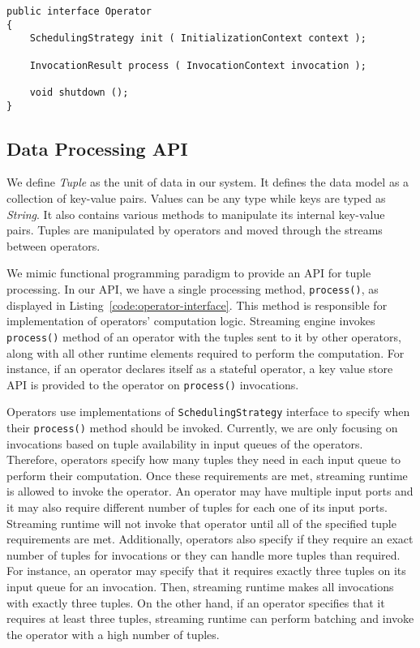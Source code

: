 \lstset{language=JAVA, caption="Operator Interface"}
\begin{lstlisting}[frame=single] 
public interface Operator
{
    SchedulingStrategy init ( InitializationContext context );
	
    InvocationResult process ( InvocationContext invocation );

    void shutdown ();
}
\end{lstlisting}
\label{code:operator-interface}

\subsection{Data Processing API}\label{sec:data-processing-api}

We define \textit{Tuple} as the unit of data in our system. It defines the data model as a collection of key-value pairs. Values can be any type while keys are typed as \textit{String}. It also contains various methods to manipulate its internal key-value pairs. Tuples are manipulated by operators and moved through the streams between operators.

We mimic functional programming paradigm to provide an API for tuple processing. In our API, we have a single processing method, \texttt{process()}, as displayed in Listing~\ref{code:operator-interface}. This method is responsible for implementation of operators' computation logic. Streaming engine invokes \texttt{process()} method of an operator with the tuples sent to it by other operators, along with all other runtime elements required to perform the computation. For instance, if an operator declares itself as a stateful operator, a key value store API is provided to the operator on \texttt{process()} invocations. 

Operators use implementations of \texttt{SchedulingStrategy} interface to specify when their \texttt{process()} method should be invoked. Currently, we are only focusing on invocations based on tuple availability in input queues of the operators. Therefore, operators specify how many tuples they need in each input queue to perform their computation. Once these requirements are met, streaming runtime is allowed to invoke the operator. An operator may have multiple input ports and it may also require different number of tuples for each one of its input ports. Streaming runtime will not invoke that operator until all of the specified tuple requirements are met. Additionally, operators also specify if they require an exact number of tuples for invocations or they can handle more tuples than required. For instance, an operator may specify that it requires exactly three tuples on its input queue for an invocation. Then, streaming runtime makes all invocations with exactly three tuples. On the other hand, if an operator specifies that it requires at least three tuples, streaming runtime can perform batching and invoke the operator with a high number of tuples. 

